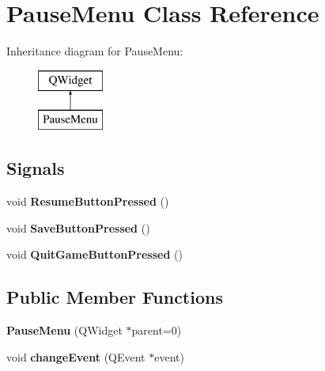 \hypertarget{classPauseMenu}{\section{Pause\-Menu Class Reference}
\label{classPauseMenu}
}
Inheritance diagram for Pause\-Menu\-:\begin{figure}[H]
\begin{center}
\leavevmode
\includegraphics[height=2.000000cm]{classPauseMenu}
\end{center}
\end{figure}
\subsection*{Signals}
\begin{DoxyCompactItemize}
\item 
\hypertarget{classPauseMenu_ac24806b40fa10843a42f3d3ba96e3e6c}{void {\bfseries Resume\-Button\-Pressed} ()}\label{classPauseMenu_ac24806b40fa10843a42f3d3ba96e3e6c}

\item 
\hypertarget{classPauseMenu_a1525fb2d41bade59de33cad48d23b9d8}{void {\bfseries Save\-Button\-Pressed} ()}\label{classPauseMenu_a1525fb2d41bade59de33cad48d23b9d8}

\item 
\hypertarget{classPauseMenu_af1e7daf3f16ddca8633d9ee393f33dbb}{void {\bfseries Quit\-Game\-Button\-Pressed} ()}\label{classPauseMenu_af1e7daf3f16ddca8633d9ee393f33dbb}

\end{DoxyCompactItemize}
\subsection*{Public Member Functions}
\begin{DoxyCompactItemize}
\item 
\hypertarget{classPauseMenu_a7e37f17609a107981090585aad89a1ec}{{\bfseries Pause\-Menu} (Q\-Widget $\ast$parent=0)}\label{classPauseMenu_a7e37f17609a107981090585aad89a1ec}

\item 
\hypertarget{classPauseMenu_a7ae2f7ecbb859e6370d474db4d086892}{void {\bfseries change\-Event} (Q\-Event $\ast$event)}\label{classPauseMenu_a7ae2f7ecbb859e6370d474db4d086892}

\end{DoxyCompactItemize}


